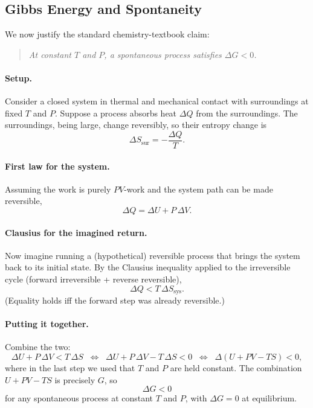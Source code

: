 \subsection{Gibbs Energy and Spontaneity}

We now justify the standard chemistry-textbook claim:
\begin{quote}
\textit{At constant $T$ and $P$, a spontaneous process satisfies $\Delta G < 0$.}
\end{quote}

\paragraph{Setup.} Consider a closed system in thermal and mechanical contact with surroundings at fixed $T$ and $P$. Suppose a process absorbs heat $\Delta Q$ from the surroundings. The surroundings, being large, change reversibly, so their entropy change is
\[
    \Delta S_{\text{sur}} = -\frac{\Delta Q}{T}.
\]
\paragraph{First law for the system.} Assuming the work is purely $PV$-work and the system path can be made reversible,
\[
    \Delta Q = \Delta U + P\,\Delta V.
\]
\paragraph{Clausius for the imagined return.} Now imagine running a (hypothetical) reversible process that brings the system back to its initial state. By the Clausius inequality applied to the irreversible cycle (forward irreversible + reverse reversible),
\[
    \Delta Q < T\,\Delta S_{\text{sys}}.
\]
(Equality holds iff the forward step was already reversible.)

\paragraph{Putting it together.} Combine the two:
\[
    \Delta U + P\,\Delta V < T\,\Delta S
    \;\;\Longleftrightarrow\;\;
    \Delta U + P\,\Delta V - T\,\Delta S < 0
    \;\;\Longleftrightarrow\;\;
    \Delta(U + PV - TS) < 0,
\]
where in the last step we used that $T$ and $P$ are held constant. The combination $U + PV - TS$ is precisely $G$, so
\[
    \boxed{\,\Delta G < 0\,}
\]
for any spontaneous process at constant $T$ and $P$, with $\Delta G = 0$ at equilibrium.

